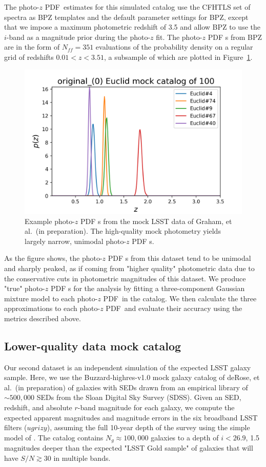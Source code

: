 \documentclass[\docopts]{\docclass}
\newcommand{\pz}{photo-$z$ PDF\xspace}
\begin{document}
The \pz\ estimates for this simulated catalog use the CFHTLS set of spectra 
\citep{ilbert_accurate_2006} as BPZ templates and the default parameter 
settings for BPZ, except that we impose a maximum photometric redshift of 3.5 
and allow BPZ to use the $i$-band as a magnitude prior during the photo-$z$ fit.
The \pz s from BPZ are in the form of $N_{ff} = 351$ evaluations of the 
probability density on a regular grid of redshifts $0.01 < z < 3.51$, a 
subsample of which are plotted in Figure~\ref{fig:graham_pzs}.

\begin{figure}
  \includegraphics[width=0.9\columnwidth]{figures/graham_pzs.png}
  \caption{Example \pz s from the mock LSST data of Graham, et al.\ (in 
preparation).
  The high-quality mock photometry yields largely narrow, unimodal \pz s.
  \label{fig:graham_pzs}}
\end{figure}

As the figure shows, the \pz s from this dataset tend to be unimodal and 
sharply peaked, as if coming from "higher quality" photometric data due to the 
conservative cuts in photometric magnitudes of this dataset.
We produce "true" \pz s for the analysis by fitting a three-component Gaussian 
mixture model to each \pz\ in the catalog.
We then calculate the three approximations to each \pz\ and evaluate their 
accuracy using the metrics described above.

\subsection{Lower-quality data mock catalog}
\label{sec:schmidt}

Our second dataset is an independent simulation of the expected LSST galaxy 
sample.
Here, we use the Buzzard-highres-v1.0 mock galaxy catalog of deRose, et al.\ 
(in preparation) of galaxies with SEDs drawn from an empirical library of 
$\sim500,000$ SEDs from the Sloan Digital Sky Survey (SDSS).
Given an SED, redshift, and absolute $r$-band magnitude for each galaxy, we 
compute the expected apparent magnitudes and magnitude errors in the six 
broadband LSST filters ($ugrizy$), assuming the full 10-year depth of the 
survey using the simple model of \citet{ivezic_lsst:_2008}.
The catalog contains $N_{g}\approx100,000$ galaxies to a depth of $i<26.9$, 1.5 
magnitudes deeper than the expected "LSST Gold sample" of galaxies that will 
have $S/N\gtrsim30$ in multiple bands.
\end{document}
